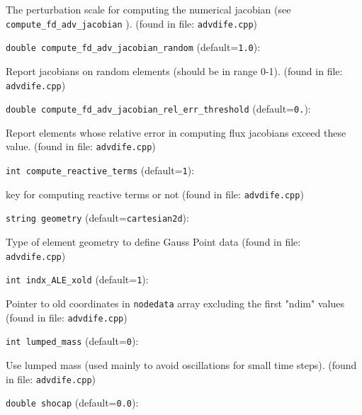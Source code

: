 The perturbation scale for computing the numerical jacobian
 (see \verb+compute_fd_adv_jacobian+ ).
 (found in file: \verb+advdife.cpp+)
\item\verb+double compute_fd_adv_jacobian_random+ {\rm(default=\verb|1.0|)}:

Report jacobians on random elements (should be in range 0-1).
 (found in file: \verb+advdife.cpp+)
\item\verb+double compute_fd_adv_jacobian_rel_err_threshold+ {\rm(default=\verb|0.|)}:

Report elements whose relative error in computing
 flux jacobians exceed these value.
 (found in file: \verb+advdife.cpp+)
\item\verb+int compute_reactive_terms+ {\rm(default=\verb|1|)}:

key for computing reactive terms or not
 (found in file: \verb+advdife.cpp+)
\item\verb+string geometry+ {\rm(default=\verb|cartesian2d|)}:

Type of element geometry to define Gauss Point data
 (found in file: \verb+advdife.cpp+)
\item\verb+int indx_ALE_xold+ {\rm(default=\verb|1|)}:

Pointer to old coordinates in
 \verb+nodedata+ array excluding the first "ndim" values
 (found in file: \verb+advdife.cpp+)
\item\verb+int lumped_mass+ {\rm(default=\verb|0|)}:

Use lumped mass (used mainly to avoid oscillations for small time steps).
 (found in file: \verb+advdife.cpp+)
\item\verb+double shocap+ {\rm(default=\verb|0.0|)}:

